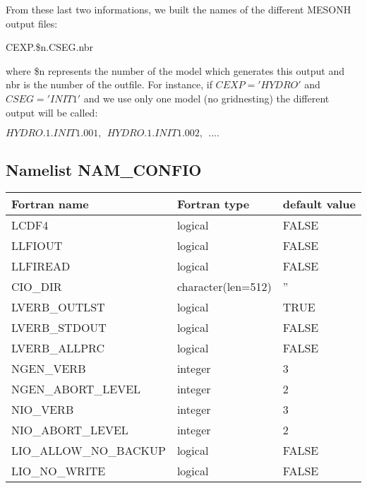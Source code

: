 From these last two informations, we built the names of the different MESONH
output files: 

CEXP.\$n.CSEG.nbr

where \$n represents the number of the model which generates this output and nbr
is the number of the outfile. For instance, if $CEXP='HYDRO'$ and $CSEG='INIT1'$
and we use only  one model (no gridnesting) the different output will be called:

$HYDRO.1.INIT1.001 , \ \ HYDRO.1.INIT1.002, \ \ ....$
\subsection{Namelist NAM\_CONFIO}\label{s:namconfio}

\begin{center}
\begin{tabular} {|l|l|l|}
\hline
Fortran name & Fortran type & default value \\
\hline
LCDF4      & logical  & FALSE  \\
LLFIOUT    & logical  & FALSE  \\
LLFIREAD   & logical  & FALSE  \\
\hline
CIO\_DIR & character(len=512) & '' \\
\hline
LVERB\_OUTLST      & logical & TRUE  \\
LVERB\_STDOUT      & logical & FALSE \\
LVERB\_ALLPRC      & logical & FALSE \\
NGEN\_VERB         & integer & 3 \\
NGEN\_ABORT\_LEVEL & integer & 2 \\
NIO\_VERB          & integer & 3 \\
NIO\_ABORT\_LEVEL  & integer & 2 \\
\hline
LIO\_ALLOW\_NO\_BACKUP & logical & FALSE \\
LIO\_NO\_WRITE         & logical & FALSE \\
\hline
\end{tabular}
\end{center}

